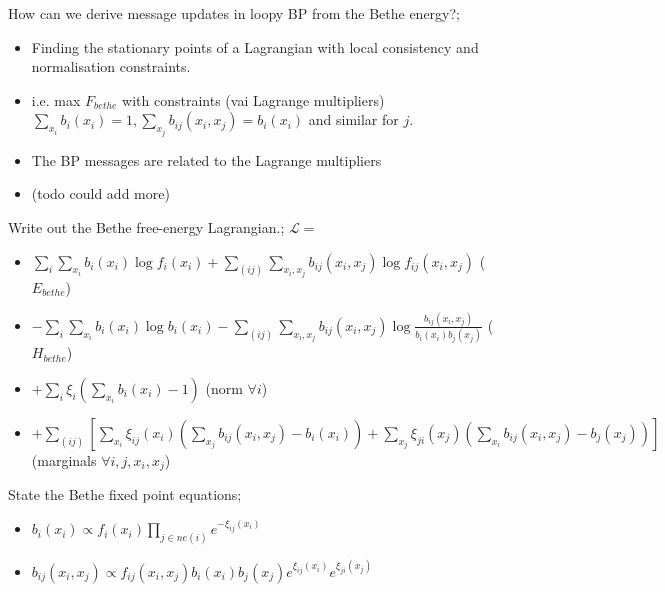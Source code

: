 \documentclass{article}
\begin{document}
How can we derive message updates in loopy BP from the Bethe energy?; \begin{itemize} \item Finding the stationary points of a Lagrangian with local consistency and normalisation constraints. \item i.e. max $F_{bethe}$ with constraints (vai Lagrange multipliers) $\sum_{x_i}b_i(x_i) = 1, \sum_{x_j}b_{ij}(x_i, x_j) = b_i(x_i)$ and similar for $j$. \item The BP messages are related to the Lagrange multipliers \item (todo could add more) \end{itemize}

Write out the Bethe free-energy Lagrangian.; $\mathcal{L} =$\begin{itemize} \item $\sum_i \sum_{x_i} b_i(x_i)\log f_i(x_i) + \sum_{(ij)}\sum_{x_i, x_j} b_{ij}(x_i, x_j)\log f_{ij}(x_i, x_j)$ ($E_{bethe}$) \item $-\sum_i \sum_{x_i}b_i(x_i)\log b_i(x_i) - \sum_{(ij)}\sum_{x_i, x_j}b_{ij}(x_i, x_j)\log \frac{b_{ij}(x_i, x_j)}{b_i(x_i)b_j(x_j)}$ ($H_{bethe}$) \item $+\sum_i \xi_i (\sum_{x_i}b_i(x_i) - 1)$ (norm $\forall i$) \item $+ \sum_{(ij)}[\sum_{x_i}\xi_{ij}(x_i)(\sum_{x_j}b_{ij}(x_i, x_j) - b_i(x_i)) + \sum_{x_j}\xi_{ji}(x_j)(\sum_{x_i}b_{ij}(x_i, x_j) - b_j(x_j))]$ (marginals $\forall i, j, x_i, x_j$) \end{itemize}

State the Bethe fixed point equations; \begin{itemize} \item $b_i(x_i) \propto f_i(x_i)\prod_{j\in ne(i)} e^{-\xi_{ij}(x_i)}$ \item $b_{ij}(x_i, x_j) \propto f_{ij}(x_i, x_j)b_i(x_i)b_j(x_j)e^{\xi_{ij}(x_i)}e^{\xi_{ji}(x_j)}$ \end{itemize}
\end{document}
